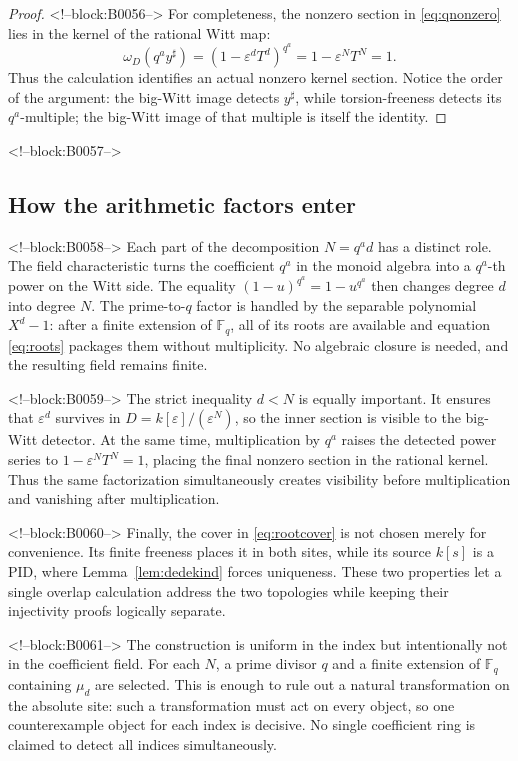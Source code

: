 \documentclass[11pt]{article}
\theoremstyle{definition}
\newcommand{\sh}{\sharp}
\begin{document}
\begin{proof}
<!--block:B0056-->
For completeness, the nonzero section in \eqref{eq:qnonzero} lies in the
kernel of the rational Witt map:
\[
 \omega_D(q^a y^\sh)
  =(1-\varepsilon^dT^d)^{q^a}
  =1-\varepsilon^NT^N=1.
 \tag{4.13}\label{eq:inkernel}
\]
Thus the calculation identifies an actual nonzero kernel section.  Notice
the order of the argument: the big-Witt image detects
\(y^\sh\), while torsion-freeness detects its \(q^a\)-multiple; the
big-Witt image of that multiple is itself the identity.
\end{proof}

<!--block:B0057-->
\subsection{How the arithmetic factors enter}\label{subsec:factors}

<!--block:B0058-->
Each part of the decomposition \(N=q^a d\) has a distinct role.  The field
characteristic turns the coefficient \(q^a\) in the monoid algebra into a
\(q^a\)-th power on the Witt side.  The equality
\((1-u)^{q^a}=1-u^{q^a}\) then changes degree \(d\) into degree \(N\).
The prime-to-\(q\) factor is handled by the separable polynomial
\(X^d-1\): after a finite extension of \(\mathbb F_q\), all of its roots
are available and equation \eqref{eq:roots} packages them without
multiplicity.  No algebraic closure is needed, and the resulting field
remains finite.

<!--block:B0059-->
The strict inequality \(d<N\) is equally important.  It ensures that
\(\varepsilon^d\) survives in
\(D=k[\varepsilon]/(\varepsilon^N)\), so the inner section is visible to
the big-Witt detector.  At the same time, multiplication by \(q^a\) raises
the detected power series to
\(1-\varepsilon^NT^N=1\), placing the final nonzero section in the rational
kernel.  Thus the same factorization simultaneously creates visibility
before multiplication and vanishing after multiplication.

<!--block:B0060-->
Finally, the cover in \eqref{eq:rootcover} is not chosen merely for
convenience.  Its finite freeness places it in both sites, while its source
\(k[s]\) is a PID, where Lemma~\ref{lem:dedekind} forces uniqueness.
These two properties let a single overlap calculation address the two
topologies while keeping their injectivity proofs logically separate.

<!--block:B0061-->
The construction is uniform in the index but intentionally not in the
coefficient field.  For each \(N\), a prime divisor \(q\) and a finite
extension of \(\mathbb F_q\) containing \(\mu_d\) are selected.  This is
enough to rule out a natural transformation on the absolute site: such a
transformation must act on every object, so one counterexample object for
each index is decisive.  No single coefficient ring is claimed to detect
all indices simultaneously.
\end{document}
